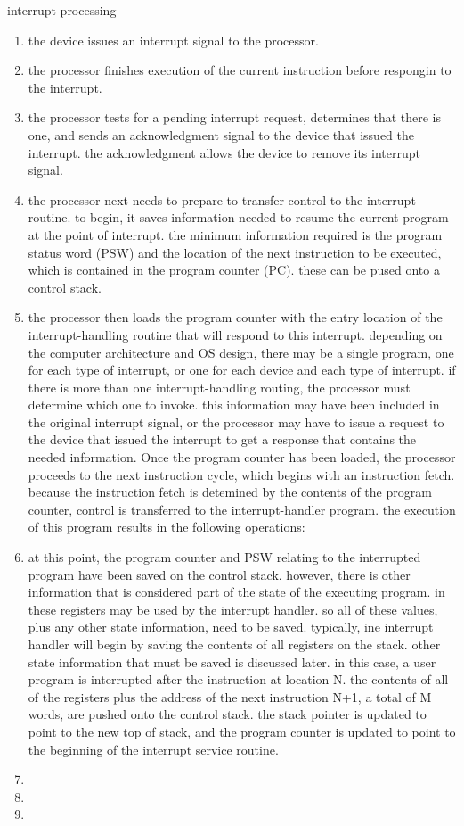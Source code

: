 \documentclass{article}
\begin{document}
interrupt processing
	\begin{enumerate}
		\item the device issues an interrupt signal to the processor.
		\item the processor finishes execution of the current instruction before respongin to the interrupt.
		\item the processor tests for a pending interrupt request, determines that there is one, and sends an acknowledgment signal to the device that issued the interrupt. the acknowledgment allows the device to remove its interrupt signal.
		\item the processor next needs to prepare to transfer control to the interrupt routine. to begin, it saves information needed to resume the current program at the point of interrupt. the minimum information required is the program status word (PSW) and the location of the next instruction to be executed, which is contained in the program counter (PC). these can be pused onto a control stack.
		\item the processor then loads the program counter with the entry location of the interrupt-handling routine that will respond to this interrupt. depending on the computer architecture and OS design, there may be a single program, one for each type of interrupt, or one for each device and each type of interrupt. if there is more than one interrupt-handling routing, the processor must determine which one to invoke. this information may have been included in the original interrupt signal, or the processor may have to issue a request to the device that issued the interrupt to get a response that contains the needed information.
		Once the program counter has been loaded, the processor proceeds to the next instruction cycle, which begins with an instruction fetch. because the instruction fetch is detemined by the contents of the program counter, control is transferred to the interrupt-handler program. the execution of this program results in the following operations:

	\item at this point, the program counter and PSW relating to the interrupted program have been saved on the control stack. however, there is other information that is considered part of the state of the executing program. in these registers may be used by the interrupt handler. so all of these values, plus any other state information, need to be saved. typically, ine interrupt handler will begin by saving the contents of all registers on the stack. other state information that must be saved is discussed later. in this case, a user program is interrupted after the instruction at location N. the contents of all of the registers plus the address of the next instruction N+1, a total of M words, are pushed onto the control stack. the stack pointer is updated to point to the new top of stack, and the program counter is updated to point to the beginning of the interrupt service routine.
		\item
		\item
		\item
	\end{enumerate}




\maketitle
\end{document}
